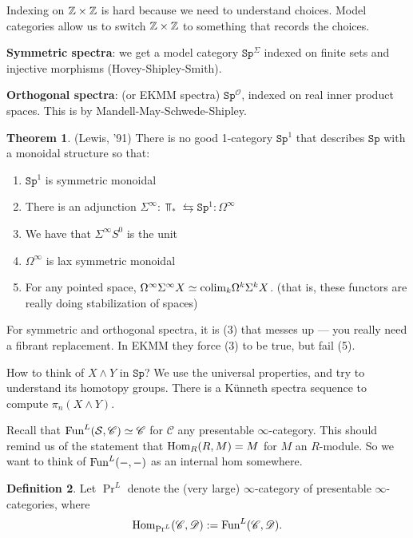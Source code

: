 \documentclass[12pt]{amsart}
\theoremstyle{definition}
\newtheorem{theorem}{Theorem}[section]
\newtheorem{definition}[theorem]{Definition}
\renewcommand{\O}{\mathcal{O}}
\let\smashprod\wedge
\providecommand{\Sp}{\texttt{Sp}}
\providecommand{\Sp}{\text{Sp}}
\begin{document}
Indexing on $\mathbb{Z} \times \mathbb{Z}$ is hard because we need to understand choices. Model categories allow us to switch $\mathbb{Z} \times \mathbb{Z}$ to something that records the choices.

\textbf{Symmetric spectra}: we get a model category $\Sp^\Sigma$ indexed on finite sets and injective morphisms (Hovey-Shipley-Smith).

\textbf{Orthogonal spectra}: (or EKMM spectra) $\Sp^\O$, indexed on real inner product spaces. This is by Mandell-May-Schwede-Shipley.

\begin{theorem} (Lewis, '91) There is no good 1-category $\Sp^1$ that describes $\Sp$ with a monoidal structure so that:
\begin{enumerate}
    \item $\Sp^1$ is symmetric monoidal
    \item There is an adjunction $\Sigma^\infty: \Top_\ast \leftrightarrows \Sp^1 : \Omega^\infty$
    \item We have that $\Sigma^\infty S^0$ is the unit
    \item $\Omega^\infty$ is lax symmetric monoidal
    \item For any pointed space, $\Omega^\infty \Sigma^\infty X \simeq \text{colim}_k \Omega^k \Sigma^k X$. (that is, these functors are really doing stabilization of spaces)
\end{enumerate}
\end{theorem}

For symmetric and orthogonal spectra, it is (3) that messes up --- you really need a fibrant replacement. In EKMM they force (3) to be true, but fail (5).

How to think of $X \smashprod Y$ in $\Sp$? We use the universal properties, and try to understand its homotopy groups. There is a K\"unneth spectra sequence to compute $\pi_n(X \smashprod Y)$.

Recall that $\text{Fun}^L(\mathcal{S},\mathscr{C}) \simeq \mathscr{C}$ for $\mathscr{C}$ any presentable $\infty$-category. This should remind us of the statement that $\text{Hom}_R(R,M) = M$ for $M$ an $R$-module. So we want to think of $\text{Fun}^L(-,-)$ as an internal hom somewhere.

\begin{definition} Let $\Pr^L$ denote the (very large) $\infty$-category of presentable $\infty$-categories, where
\begin{align*}
    \text{Hom}_{\Pr^L}(\mathscr{C},\mathscr{D}) := \text{Fun}^L(\mathscr{C},\mathscr{D}).
\end{align*}
\end{definition}
\end{document}
